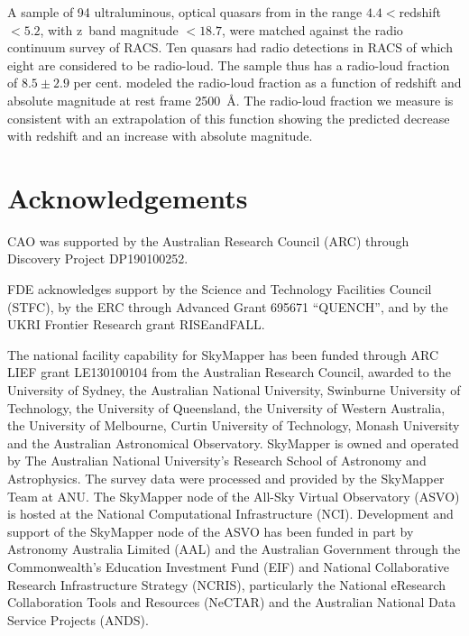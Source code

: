 \documentclass[a4paper,fleqn,usenatbib]{mnras}
\begin{document}
A sample of 94 ultraluminous, optical quasars from \citet{onken22} in the range $4.4<$redshift$<5.2$, with z~band magnitude $<18.7$, were matched against the radio continuum survey of RACS.  Ten quasars had radio detections in RACS of which eight are considered to be radio-loud.  The sample thus has a radio-loud fraction of $8.5 \pm 2.9$ per cent.  \citet{jiang07} modeled the radio-loud fraction as a function of redshift and absolute magnitude at rest frame 2500~\AA.  The radio-loud fraction we measure is consistent with an extrapolation of this function showing the predicted decrease with redshift and an increase with absolute magnitude.


\section*{Acknowledgements}

CAO was supported by the Australian Research Council (ARC) through Discovery Project DP190100252.

FDE acknowledges support by the Science and Technology Facilities Council (STFC), by the ERC through Advanced Grant 695671 ``QUENCH'', and by the UKRI Frontier Research grant RISEandFALL.

The national facility capability for SkyMapper has been funded through ARC LIEF grant LE130100104 from the Australian Research Council, awarded to the University of Sydney, the Australian National University, Swinburne University of Technology, the University of Queensland, the University of Western Australia, the University of Melbourne, Curtin University of Technology, Monash University and the Australian Astronomical Observatory. SkyMapper is owned and operated by The Australian National University's Research School of Astronomy and Astrophysics. The survey data were processed and provided by the SkyMapper Team at ANU. The SkyMapper node of the All-Sky Virtual Observatory (ASVO) is hosted at the National Computational Infrastructure (NCI). Development and support of the SkyMapper node of the ASVO has been funded in part by Astronomy Australia Limited (AAL) and the Australian Government through the Commonwealth's Education Investment Fund (EIF) and National Collaborative Research Infrastructure Strategy (NCRIS), particularly the National eResearch Collaboration Tools and Resources (NeCTAR) and the Australian National Data Service Projects (ANDS).
\end{document}
